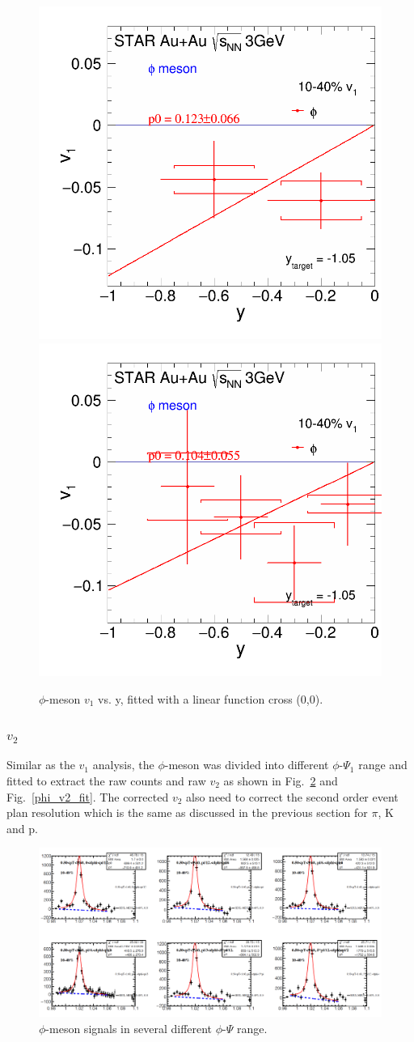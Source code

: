 \begin{figure}[h]
\includegraphics[width=0.49\linewidth]{chapterY/fig/fig1_phi_v1Slop1_10_40.png}
\includegraphics[width=0.49\linewidth]{chapterY/fig/fig1_phi_v1Slop11_10_40.png}
  \caption{$\phi$-meson $v_1$ vs. y, fitted with a linear function cross (0,0).}
\label{phi_dv1dy}
\end{figure}

\subsubsection{$v_2$}

Similar as the $v_1$ analysis, the $\phi$-meson was divided into different $\phi$-$\Psi_{1}$ range and fitted to extract the raw counts and raw $v_2$ as shown in Fig.~\ref{phi_v2} and Fig.~\ref{phi_v2_fit}. The corrected $v_2$ also need to correct the second order event plan resolution which is the same as discussed in the previous section for $\pi$, K and p.

\begin{figure}[h]
\includegraphics[width=0.98\linewidth]{chapterY/fig/phi_invEP_v2_10_40.png}
\caption{$\phi$-meson signals in several different $\phi$-$\Psi$ range.}
\label{phi_v2}
\end{figure}

